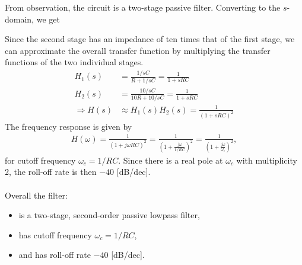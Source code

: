 \documentclass{report}
\begin{document}
\begin{solution}
    From observation, the circuit is a two-stage passive filter. Converting to the $s$-domain, we get
    \begin{center}
    \end{center}
    Since the second stage has an impedance of ten times that of the first stage, we can approximate the overall transfer function by multiplying the transfer functions of the two individual stages.
    \begin{align*}
        H_1(s) &= \frac{1/sC}{R+1/sC} = \frac{1}{1+sRC} \\
        H_2(s) &= \frac{10/sC}{10R+10/sC} = \frac{1}{1+sRC} \\
        \Longrightarrow H(s) &\approx H_1(s)H_2(s) = \frac{1}{(1+sRC)^2}
    \end{align*}
    The frequency response is given by
    \begin{align*}
        H(\omega) = \frac{1}{(1+j\omega RC)^2} = \frac{1}{(1+\frac{j\omega}{1/RC})^2} = \frac{1}{(1+\frac{j\omega}{\omega_c})^2},
    \end{align*}
    for cutoff frequency $\omega_c=1/RC$. Since there is a real pole at $\omega_c$ with multiplicity 2, the roll-off rate is then $-40$ [dB/dec].
    \\ \\ 
    Overall the filter:
    \begin{itemize}
        \item is a two-stage, second-order passive lowpass filter,
        \item has cutoff frequency $\omega_c=1/RC$,
        \item and has roll-off rate $-40$ [dB/dec].
    \end{itemize}
\end{solution}
\end{document}
